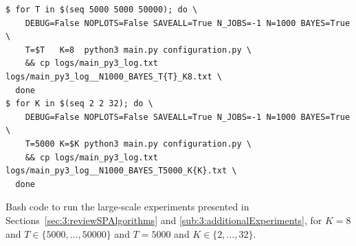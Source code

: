 \begin{listing}[h!]
    \begin{verbatim}
$ for T in $(seq 5000 5000 50000); do \
    DEBUG=False NOPLOTS=False SAVEALL=True N_JOBS=-1 N=1000 BAYES=True \
    T=$T   K=8  python3 main.py configuration.py \
    && cp logs/main_py3_log.txt logs/main_py3_log__N1000_BAYES_T{T}_K8.txt \
  done
$ for K in $(seq 2 2 32); do \
    DEBUG=False NOPLOTS=False SAVEALL=True N_JOBS=-1 N=1000 BAYES=True \
    T=5000 K=$K python3 main.py configuration.py \
    && cp logs/main_py3_log.txt logs/main_py3_log__N1000_BAYES_T5000_K{K}.txt \
  done
    \end{verbatim}
    \caption{Bash code to run the large-scale experiments presented in Sections~\ref{sec:3:reviewSPAlgorithms} and \ref{sub:3:additionalExperiments}, for $K=8$ and $T\in\{5000,\dots,50000\}$ and $T=5000$ and $K\in\{2,\dots,32\}$.}
    \label{lst:3:BashCodeToLaunchLargeExperiments}
\end{listing}









